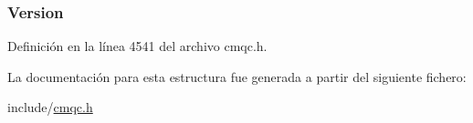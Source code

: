 \hypertarget{structtag_m_q_m_d1_a0656ef8f766b3907d394d88a35d7b7e9}{}
\subsubsection[{Version}]{ Version}\label{structtag_m_q_m_d1_a0656ef8f766b3907d394d88a35d7b7e9}


Definición en la línea 4541 del archivo cmqc.\+h.



La documentación para esta estructura fue generada a partir del siguiente fichero\+:\begin{DoxyCompactItemize}
\item 
include/\hyperlink{cmqc_8h}{cmqc.\+h}\end{DoxyCompactItemize}
